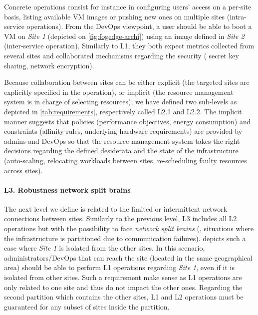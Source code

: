 Concrete operations consist for instance in configuring users'
access on a per-site basis, listing available VM images or pushing new
ones on multiple sites (intra-service operations). From the
DevOps viewpoint, a user should be able to boot a VM on \emph{Site 1} (depicted
on \cref{fig:fogedge-archi}) using an image defined in \emph{Site 2}
(inter-service operation). Similarly to L1, they both expect metrics collected
from several sites and collaborated mechanisms regarding the security (\eg
secret key sharing, network encryption).

Because collaboration between sites can be either explicit (\ie the
targeted sites are explicitly specified in the operation), or implicit
(\ie the resource management system is in charge of selecting
resources), we have defined two sub-levels as depicted in
\cref{tab:requirements}, respectively called L2.1 and L2.2. The implicit
manner suggests that policies (\eg performance objectives, energy
consumption) and constraints (\eg affinity rules, underlying hardware
requirements) are provided by admins and DevOps so that the resource management
system takes the right decisions regarding the defined desiderata and the state
of the infrastructure (\eg auto-scaling, relocating workloads between sites,
re-scheduling faulty resources across sites).

\paragraph{L3. Robustness \wrt network split brains}
The next level we define is related to the limited or intermittent
network connections between sites. Similarly to the previous level,
L3 includes all L2 operations but with the possibility to face
\emph{network split brains} (\ie, situations where the infrastructure is
partitioned due to communication failures).
%
 depicts such a case where \emph{Site 1} is isolated
from the other sites. In this scenario, administrators/DevOps that can reach
the site (\ie located in the same geographical area) should be able to perform
L1 operations regarding \emph{Site 1}, even if it is isolated from other sites.
Such a requirement make sense as L1 operations are only related to one site and
thus do not impact the other ones.
%
Regarding the second partition which contains the other sites, L1 and L2
operations must be guaranteed for any subset of sites inside the partition.

